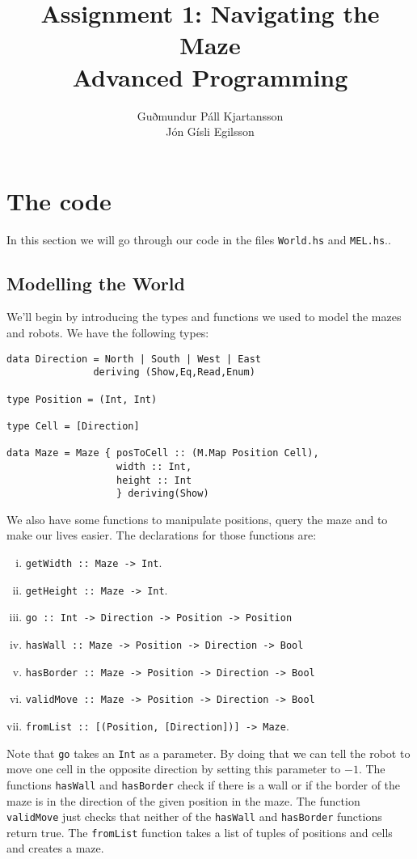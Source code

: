 \documentclass[a4paper,10pt]{article}
\title{
	Assignment 1: Navigating the Maze\\
	Advanced Programming
  }
\author{
	Guðmundur Páll Kjartansson\\
	Jón Gísli Egilsson	
}
\begin{document}
\maketitle

\section{The code}

In this section we will go through our code in the files \verb=World.hs= and \verb=MEL.hs=..

\subsection{Modelling the World}

We'll begin by introducing the types and functions we used to model the mazes and robots. We have the following types:
\begin{verbatim}
data Direction = North | South | West | East 
               deriving (Show,Eq,Read,Enum)

type Position = (Int, Int)

type Cell = [Direction]

data Maze = Maze { posToCell :: (M.Map Position Cell),
                   width :: Int,
                   height :: Int 
                   } deriving(Show)
\end{verbatim}
We also have some functions to manipulate positions, query the maze and to make our lives easier. The declarations for those functions are:
\begin{enumerate}[i.]
	\item \verb=getWidth :: Maze -> Int=.
	\item \verb=getHeight :: Maze -> Int=.
	\item \verb=go :: Int -> Direction -> Position -> Position=
	\item \verb=hasWall :: Maze -> Position -> Direction -> Bool=
	\item \verb=hasBorder :: Maze -> Position -> Direction -> Bool=
	\item \verb=validMove :: Maze -> Position -> Direction -> Bool=
	\item \verb=fromList :: [(Position, [Direction])] -> Maze=.
\end{enumerate}
Note that \verb=go= takes an \verb=Int= as a parameter. By doing that we can tell the robot to move one cell in the opposite direction by setting this parameter to $-1$. The functions \verb=hasWall= and \verb=hasBorder= check if there is a wall or if the border of the maze is in the direction of the given position in the maze. The function \verb=validMove= just checks that neither of the \verb=hasWall= and \verb=hasBorder= functions return true. The \verb=fromList= function takes a list of tuples of positions and cells and creates a maze.
\end{document}
